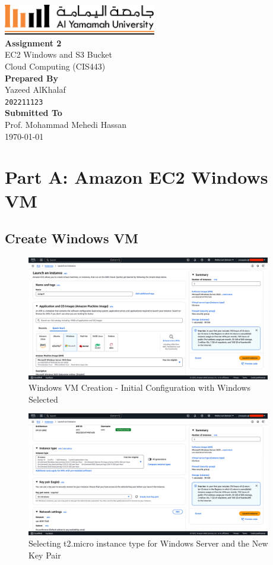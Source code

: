 \documentclass[a4paper,12pt]{article}
\def\maketitle{
  \begin{titlepage}
    \centering
    \vspace*{-1cm}
    \includegraphics[width=0.5\textwidth]{yu-logo.png}\\[2cm]
    
    {\huge\bfseries Assignment 2\\}
    \vspace{0.5cm}
    {\Large EC2 Windows and S3 Bucket}\\[1.5cm]
    
    {\large Cloud Computing (CIS443)}\\[3cm]
    
    {\large\bfseries Prepared By}\\[0.3cm]
    {\Large Yazeed AlKhalaf}\\
    {\texttt{202211123}}\\[2cm]
    
    {\large\bfseries Submitted To}\\[0.3cm]
    {\Large Prof. Mohammad Mehedi Hassan}\\[2cm]
    
    {\large \today}
    
    \vfill
  \end{titlepage}
}
\begin{document}
\maketitle

\thispagestyle{fancy}
\tableofcontents
\newpage

\thispagestyle{fancy}
\listoffigures
\newpage

\setcounter{page}{1}

\section{Part A: Amazon EC2 Windows VM}

\subsection{Create Windows VM}

\begin{figure}[H]
    \centering
    \includegraphics[width=0.95\textwidth]{create-windows-vm-1.png}
    \caption{Windows VM Creation - Initial Configuration with Windows Selected}
    \label{fig:windows-vm1}
\end{figure}

\begin{figure}[H]
    \centering
    \includegraphics[width=0.95\textwidth]{create-windows-vm-2.png}
    \caption{Selecting t2.micro instance type for Windows Server and the New Key Pair}
    \label{fig:windows-vm2}
\end{figure}
\end{document}
